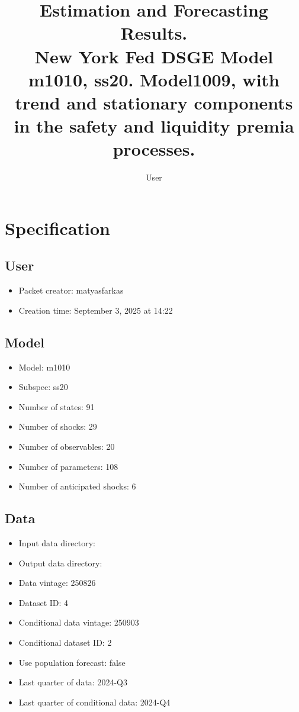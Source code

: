 \documentclass{article}
\title{Estimation and Forecasting Results. \\ New York Fed DSGE Model m1010, ss20. Model1009, with trend and stationary components in the safety and liquidity premia processes.}
\author{User}
\begin{document}
\maketitle


\section{Specification}

\subsection{User}

\begin{itemize}
  \item Packet creator: matyasfarkas
  \item Creation time: September 3, 2025 at 14:22
\end{itemize}

\subsection{Model}

\begin{itemize}
  \item Model: m1010
  \item Subspec: ss20
  \item Number of states: 91
  \item Number of shocks: 29
  \item Number of observables: 20
  \item Number of parameters: 108
  \item Number of anticipated shocks: 6
\end{itemize}

\subsection{Data}

\begin{itemize}
  \item Input data directory: 
  \item Output data directory: 
  \item Data vintage: 250826
  \item Dataset ID: 4
  \item Conditional data vintage: 250903
  \item Conditional dataset ID: 2
  \item Use population forecast: false
  \item Last quarter of data: 2024-Q3
  \item Last quarter of conditional data: 2024-Q4
\end{itemize}
\end{document}
